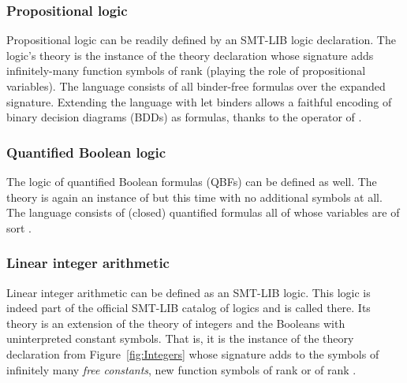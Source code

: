 \subsubsection*{Propositional logic}

Propositional logic can be readily defined by an SMT-LIB logic declaration.
The logic's theory is the instance of the  theory declaration
whose signature adds infinitely-many function symbols of rank 
(playing the role of propositional variables).
The language consists of all binder-free formulas over the expanded signature.
Extending the language with let binders
allows a faithful encoding of binary decision diagrams (BDDs) as formulas,
thanks to the  operator of .

\subsubsection*{Quantified Boolean logic}

The logic of quantified Boolean formulas (QBFs) can be defined as well.
The theory is again an instance of 
but this time with no additional symbols at all.
The language consists of (closed) quantified formulas
all of whose variables are of sort .

\subsubsection*{Linear integer arithmetic}

Linear integer arithmetic can be defined as an SMT-LIB logic.
This logic is indeed part of the official SMT-LIB catalog of logics
and is called  there.
Its theory is an extension of the theory of integers and the Booleans 
with uninterpreted constant symbols.
That is,
it is the instance of the theory declaration  
from Figure~\ref{fig:Integers}
whose signature adds to the symbols of 
infinitely many \emph{free constants},
new function symbols of rank  or of rank .

